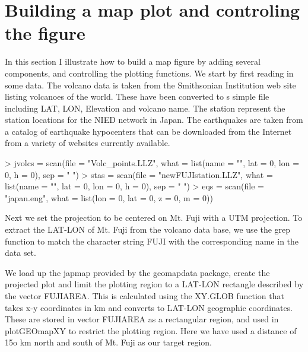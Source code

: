 \documentclass{article}
\begin{document}
\section{Building a map plot and controling the figure}


In this section I illustrate how to build a map figure by adding several components,
and controlling the plotting functions.
We start by first reading in some data.  
The volcano data is taken from the Smithsonian Institution web site
listing volcanoes of the world.  These have been converted to s simple 
file including LAT, LON, Elevation and volcano name.
The station represent the station locations for
the NIED network in Japan.
The earthquakes are taken from a catalog of earthquake hypocenters
that can be downloaded from the Internet from a variety of 
websites currently available.

\begin{Schunk}
\begin{Sinput}
> jvolcs = scan(file = "Volc_points.LLZ", what = list(name = "", 
     lat = 0, lon = 0, h = 0), sep = " ")
> stas = scan(file = "newFUJIstation.LLZ", what = list(name = "", 
     lat = 0, lon = 0, h = 0), sep = " ")
> eqs = scan(file = "japan.eng", what = list(lon = 0, lat = 0, 
     z = 0, m = 0))
\end{Sinput}
\end{Schunk}

Next we set the projection to be centered on Mt. Fuji 
with a UTM projection.
To extract the LAT-LON of Mt. Fuji from the volcano
data base, we use the grep function to match 
the character string FUJI with the corresponding name in the data set.


\begin{Schunk}
\end{Schunk}

We load up the japmap provided by the geomapdata package,
create the projected plot and limit the plotting region
to a LAT-LON rectangle described by the vector FUJIAREA.
This is calculated using the XY.GLOB function that takes x-y 
coordinates in km and converts to LAT-LON geographic coordinates.
These are stored in vector FUJIAREA as
a rectangular region, and used in plotGEOmapXY
to restrict the plotting region.  Here we have 
used a distance of 15o km north and south of
Mt. Fuji as our target region.
\end{document}
